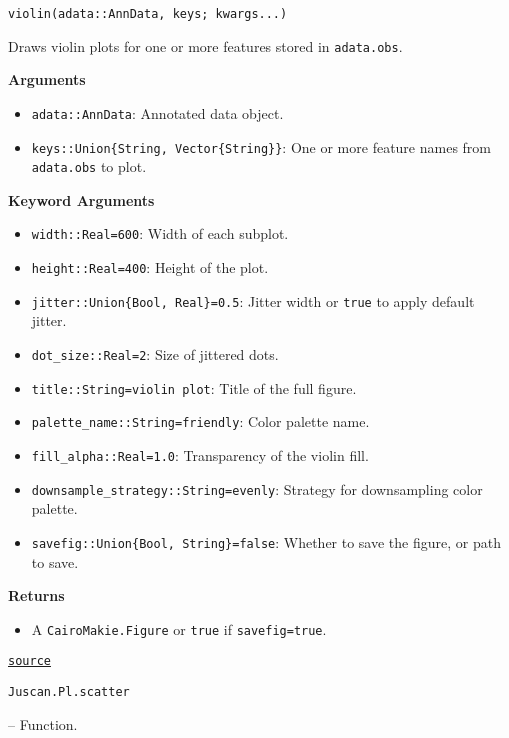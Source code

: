 \documentclass[oneside]{memoir}
\begin{document}
\begin{adjustwidth}{2em}{0pt}


\begin{verbatim}
violin(adata::AnnData, keys; kwargs...)
\end{verbatim}

Draws violin plots for one or more features stored in \texttt{adata.obs}.

\textbf{Arguments}

\begin{itemize}
\item \texttt{adata::AnnData}: Annotated data object.


\item \texttt{keys::Union\{String, Vector\{String\}\}}: One or more feature names from \texttt{adata.obs} to plot.

\end{itemize}
\textbf{Keyword Arguments}

\begin{itemize}
\item \texttt{width::Real=600}: Width of each subplot.


\item \texttt{height::Real=400}: Height of the plot.


\item \texttt{jitter::Union\{Bool, Real\}=0.5}: Jitter width or \texttt{true} to apply default jitter.


\item \texttt{dot\_size::Real=2}: Size of jittered dots.


\item \texttt{title::String={\textquotedbl}violin plot{\textquotedbl}}: Title of the full figure.


\item \texttt{palette\_name::String={\textquotedbl}friendly{\textquotedbl}}: Color palette name.


\item \texttt{fill\_alpha::Real=1.0}: Transparency of the violin fill.


\item \texttt{downsample\_strategy::String={\textquotedbl}evenly{\textquotedbl}}: Strategy for downsampling color palette.


\item \texttt{savefig::Union\{Bool, String\}=false}: Whether to save the figure, or path to save.

\end{itemize}
\textbf{Returns}

\begin{itemize}
\item A \texttt{CairoMakie.Figure} or \texttt{true} if \texttt{savefig=true}.

\end{itemize}


\href{https://github.com/zehua0417/Juscan.jl/blob/393ad1b827b678ea98a738f92af658ee9ed9a403/src/plots/plots.jl#L76-L99}{\texttt{source}}


\end{adjustwidth}
\hypertarget{927881330162564964}{\texttt{Juscan.Pl.scatter}}  -- {Function.}
\end{document}

